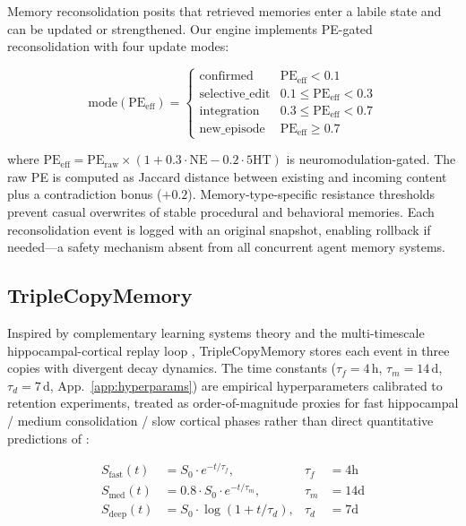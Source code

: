 \documentclass{article}
\begin{document}
Memory reconsolidation \citep{nader2000,nader2009} posits that retrieved
memories enter a labile state and can be updated or strengthened.
Our engine implements PE-gated reconsolidation with four update modes:

\begin{equation}
    \text{mode}(\text{PE}_{\text{eff}}) =
    \begin{cases}
        \text{confirmed}       & \text{PE}_{\text{eff}} < 0.1 \\
        \text{selective\_edit}  & 0.1 \leq \text{PE}_{\text{eff}} < 0.3 \\
        \text{integration}     & 0.3 \leq \text{PE}_{\text{eff}} < 0.7 \\
        \text{new\_episode}    & \text{PE}_{\text{eff}} \geq 0.7
    \end{cases}
\end{equation}

where $\text{PE}_{\text{eff}} = \text{PE}_{\text{raw}} \times (1 + 0.3 \cdot \text{NE} - 0.2 \cdot \text{5HT})$
is neuromodulation-gated. The raw PE is computed as Jaccard distance
between existing and incoming content plus a contradiction bonus ($+0.2$).
Memory-type-specific resistance thresholds prevent casual overwrites of
stable procedural and behavioral memories.
Each reconsolidation event is logged with an original snapshot,
enabling rollback if needed---a safety mechanism absent from all
concurrent agent memory systems.

\subsection{TripleCopyMemory}
\label{sec:triple}

Inspired by complementary learning systems theory
\citep{basel2024,kumaran2016} and the multi-timescale hippocampal-cortical
replay loop \citep{stickgold2013,ji2007},
TripleCopyMemory stores each event in three copies with divergent
decay dynamics. The time constants
($\tau_f{=}4\,\text{h}$, $\tau_m{=}14\,\text{d}$, $\tau_d{=}7\,\text{d}$,
App.~\ref{app:hyperparams}) are empirical hyperparameters calibrated
to retention experiments, treated as order-of-magnitude proxies for
fast hippocampal / medium consolidation / slow cortical phases rather
than direct quantitative predictions of \citet{basel2024}:

\begin{align}
    S_{\text{fast}}(t) &= S_0 \cdot e^{-t/\tau_f}, &\tau_f &= 4\text{h} \label{eq:fast} \\
    S_{\text{med}}(t) &= 0.8 \cdot S_0 \cdot e^{-t/\tau_m}, &\tau_m &= 14\text{d} \label{eq:medium} \\
    S_{\text{deep}}(t) &= S_0 \cdot \log(1 + t/\tau_d), &\tau_d &= 7\text{d} \label{eq:deep}
\end{align}
\end{document}

